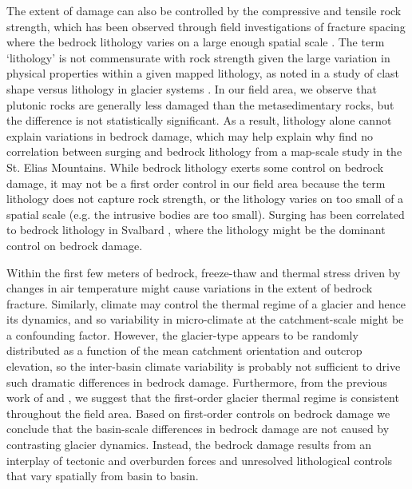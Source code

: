 \documentclass[draft,linenumbers]{agujournal}
\begin{document}
The extent of damage can also be controlled by the compressive and tensile rock strength, which has been observed through field investigations of fracture spacing where the bedrock lithology varies on a large enough spatial scale \citep[e.g.][]{Sturzenegger2007}. The term `lithology' is not commensurate with rock strength given the large variation in physical properties within a given mapped lithology, as noted in a study of clast shape versus lithology in glacier systems \citep{Lukas2013}. In our field area, we observe that plutonic rocks are generally less damaged than the metasedimentary rocks, but the difference is not statistically significant. As a result, lithology alone cannot explain variations in bedrock damage, which may help explain why \cite{Clarke1986} find no correlation between surging and bedrock lithology from a map-scale study in the St. Elias Mountains. While bedrock lithology exerts some control on bedrock damage, it may not be a first order control in our field area because the term lithology does not capture rock strength, or the lithology varies on too small of a spatial scale (e.g. the intrusive bodies are too small). Surging has been correlated to bedrock lithology in Svalbard \citep{Hamilton1996,Jiskoot1998}, where the lithology might be the dominant control on bedrock damage.

Within the first few meters of bedrock, freeze-thaw and thermal stress driven by changes in air temperature might cause variations in the extent of bedrock fracture. Similarly, climate may control the thermal regime of a glacier and hence its dynamics, and so variability in micro-climate at the catchment-scale might be a confounding factor. However, the glacier-type appears to be randomly distributed as a function of the mean catchment orientation and outcrop elevation, so the inter-basin climate variability is probably not sufficient to drive such dramatic differences in bedrock damage. Furthermore, from the previous work of \cite{Wilson2013a} and \cite{Wilson2013}, we suggest that the first-order glacier thermal regime is consistent throughout the field area. Based on first-order controls on bedrock damage we conclude that the basin-scale differences in bedrock damage are not caused by contrasting glacier dynamics. Instead, the bedrock damage results from an interplay of tectonic and overburden forces and unresolved lithological controls that vary spatially from basin to basin. 

\end{document}
